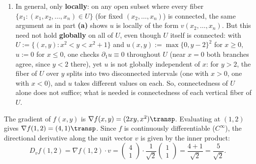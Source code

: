 \begin{exercisesolution}
\begin{enumerate}[label=\textbf{(\alph*)}]
\[    \]
  \item In general, only \textbf{locally}: on any open subset where every fiber
    $\{x_1 : (x_1,x_2,\dots,x_n) \in U\}$ (for fixed $(x_2,\dots,x_n)$) is connected, the same
    argument as in part \textbf{(a)} shows $u$ is locally of the form $v(x_2,\dots,x_n)$. But this
    need not hold \textbf{globally} on all of $U$, even though $U$ itself is connected: with
    $U := \{(x,y) : x^2 < y < x^2+1\}$ and $u(x,y) := \max\{0,y-2\}^2$ for $x \geq 0$, $u := 0$
    for $x \leq 0$, one checks $\partial_1 u \equiv 0$ throughout $U$ (near $x=0$ both branches
    agree, since $y < 2$ there), yet $u$ is not globally independent of $x$: for $y > 2$, the
    fiber of $U$ over $y$ splits into two disconnected intervals (one with $x>0$, one with
    $x<0$), and $u$ takes different values on each. So, connectedness of $U$ alone does not
    suffice; what is needed is connectedness of each vertical fiber of $U$.
\end{enumerate}
\end{exercisesolution}

\begin{exercisesolution}
\label{sol:ai_directional_derivative}
The gradient of $f(x,y)$ is $\nabla f(x,y) = (2xy, x^2)\transp$. Evaluating at $(1,2)$ gives $\nabla f(1,2) = (4,1)\transp$. Since $f$ is continuously differentiable ($C^\infty$), the directional derivative along the unit vector $v$ is given by the inner product:
\[
D_v f(1,2) = \nabla f(1,2) \cdot v = \begin{pmatrix} 4 \\ 1 \end{pmatrix} \cdot \frac{1}{\sqrt{2}}\begin{pmatrix} 1 \\ 1 \end{pmatrix} = \frac{4 + 1}{\sqrt{2}} = \frac{5}{\sqrt{2}}.
\]
\end{exercisesolution}

